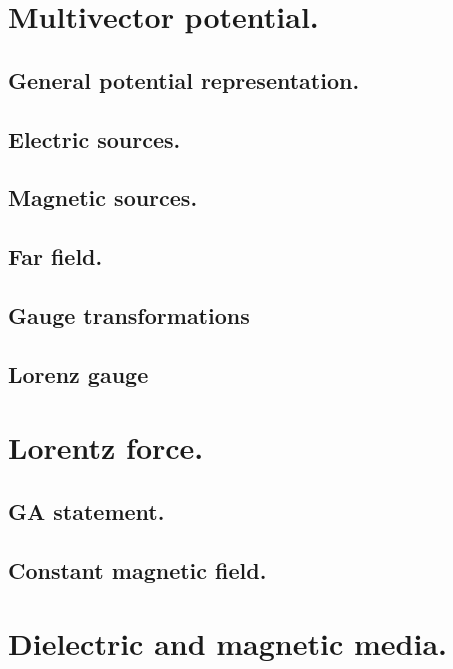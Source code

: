       \section{Multivector potential.}
         \subsection{General potential representation.}
            
         \subsection{Electric sources.}
            
         \subsection{Magnetic sources.}
            
         \subsection{Far field.}
            
         \subsection{Gauge transformations}
            
         \subsection{Lorenz gauge}
            
      \section{Lorentz force.}
         \subsection{GA statement.}
            
         \subsection{Constant magnetic field.}
            
      \section{Dielectric and magnetic media.}
         

